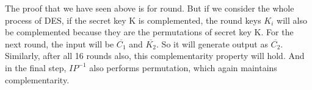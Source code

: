 \documentclass[11pt]{article}
\begin{document}
The proof that we have seen above is for round. But if we consider the whole process of DES, if the secret key K is complemented, the round keys $K_i$ will also be complemented because they are the permutations of secret key K. For the next round, the input will be $\overline{C_1}$ and $\overline{K_2}$. So it will generate output as $\overline{C_2}$. Similarly, after all 16 rounds also, this complementarity property will hold. And in the final step, $IP^{-1}$ also performs permutation, which again maintains complementarity.
\end{document}

